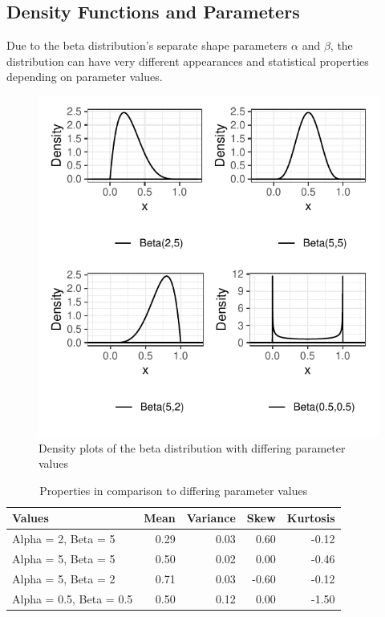 \documentclass{article}\usepackage[]{graphicx}\usepackage[]{xcolor}
\begin{document}
\begin{multicols}{2}
\section{Density Functions and Parameters}



Due to the beta distribution's separate shape parameters $\alpha$ and $\beta$, the distribution can have very different appearances and statistical properties depending on parameter values.


\begin{figure}[H]
 \begin{center}
 \includegraphics[scale=0.8]{parameter_comparison.pdf}
 \caption{Density plots of the beta distribution with differing parameter values}
 \label{fig1}
 \end{center}
 \end{figure}






\begin{table}[H]
\centering
\begingroup\small
\begin{tabular}{lrrrr}
  \hline
Values & Mean & Variance & Skew & Kurtosis \\ 
  \hline
Alpha = 2, Beta = 5 & 0.29 & 0.03 & 0.60 & -0.12 \\ 
  Alpha = 5, Beta = 5 & 0.50 & 0.02 & 0.00 & -0.46 \\ 
  Alpha = 5, Beta = 2 & 0.71 & 0.03 & -0.60 & -0.12 \\ 
  Alpha = 0.5, Beta = 0.5 & 0.50 & 0.12 & 0.00 & -1.50 \\ 
   \hline
\end{tabular}
\endgroup
\caption{Properties in comparison to differing parameter values} 
\label{distrib.tab}
\end{table}



\end{multicols}
\end{document}
